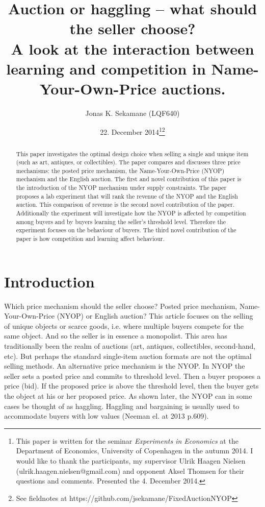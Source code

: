 \documentclass[a4paper,12pt]{article}
\title{\Large {\bf Auction or haggling -- what should the seller choose?} \\ A look at the interaction between learning and competition in Name-Your-Own-Price auctions.}
\author{Jonas K. Sekamane (LQF640)}
\date{22. December 2014\thanks{This paper is written for the seminar \emph{Experiments in Economics} at the Department of Economics, University of Copenhagen in the autumn 2014. I would like to thank the participants, my supervisor Ulrik Haagen Nielsen (ulrik.haagen.nielsen@gmail.com) and opponent Aksel Thomsen for their questions and comments. Presented the 4. December 2014.}\thanks{See fieldnotes at https://github.com/jsekamane/FixedAuctionNYOP}}
\makeatletter
\renewcommand\tableofcontents{%
    \@starttoc{toc}%
}
\makeatother
\begin{document}
	
	\clearpage
	\thispagestyle{empty}
	
	\maketitle{}
		
	\newpage
	
	\begin{abstract}
		{This paper investigates the optimal design choice when selling a single and unique item (such as art, antiques, or collectibles). The paper compares and discusses three price mechanisms: the posted price mechanism, the Name-Your-Own-Price (NYOP) mechanism and the English auction. The first and novel contribution of this paper is the introduction of the NYOP mechanism under supply constraints. The paper proposes a lab experiment that will rank the revenue of the NYOP and the English auction. This comparison of revenue is the second novel contribution of the paper. Additionally the experiment will investigate how the NYOP is affected by competition among buyers and by buyers learning the seller's threshold level. Therefore the experiment focuses on the behaviour of buyers. The third novel contribution of the paper is how competition and learning affect behaviour.}
	\end{abstract}
	
	\tableofcontents
	
	\newpage
	
	\clearpage %
	\setcounter{page}{1}

	\section{Introduction}

	Which price mechanism should the seller choose? Posted price mechanism, Name-Your-Own-Price (NYOP) or English auction? This article focuses on the selling of unique objects or scarce goods, i.e. where multiple buyers compete for the same object. And so the seller is in essence a monopolist. This area has traditionally been the realm of auctions (art, antiques, collectibles, second-hand, etc). But perhaps the standard single-item auction formats are not the optimal selling methods. An alternative price mechanism is the NYOP. In NYOP the seller sets a posted price and commits to threshold level. Then a buyer proposes a price (bid). If the proposed price is above the threshold level, then the buyer gets the object at his or her proposed price. As shown later, the NYOP can in some cases be thought of as haggling. Haggling and bargaining is usually used to accommodate buyers with low values (Neeman el. at 2013 p.609). %
	
\end{document}
